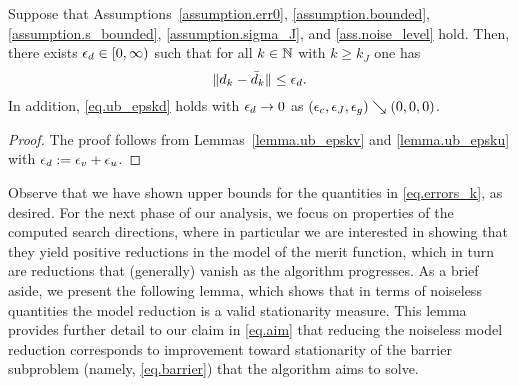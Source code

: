 \begin{corollary}\label{lemma.ub_epskd}
  Suppose that Assumptions~\ref{assumption.err0}, \ref{assumption.bounded}, \ref{assumption.s_bounded}, \ref{assumption.sigma_J}, and \ref{ass.noise_level} hold.  Then, there exists $\epsilon_d \in [0,\infty)$ such that for all $k \in \mathbb{N}$ with $k \geq k_J$ one has
  \begin{equation}\label{eq.ub_epskd}
    \|d_k - {\bar d}_k \| \leq \epsilon_d.
  \end{equation}
  In addition, \eqref{eq.ub_epskd} holds with $\epsilon_d \to 0$ as $(\epsilon_c,\epsilon_J,\epsilon_g) \searrow (0,0,0)$.
\end{corollary}
\begin{proof}
  The proof follows from Lemmas~\ref{lemma.ub_epskv} and \ref{lemma.ub_epsku} with $\epsilon_d := \epsilon_v + \epsilon_u$.
\end{proof}

Observe that we have shown upper bounds for the quantities in \eqref{eq.errors_k}, as desired.  For the next phase of our analysis, we focus on properties of the computed search directions, where in particular we are interested in showing that they yield positive reductions in the model of the merit function, which in turn are reductions that (generally) vanish as the algorithm progresses.  As a brief aside, we present the following lemma, which shows that in terms of noiseless quantities the model reduction is a valid stationarity measure.  This lemma provides further detail to our claim in \eqref{eq.aim} that reducing the noiseless model reduction corresponds to improvement toward stationarity of the barrier subproblem (namely, \eqref{eq.barrier}) that the algorithm aims to solve.

